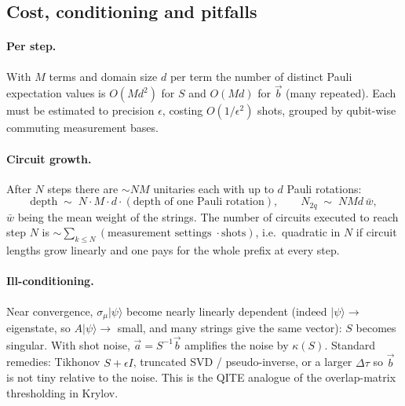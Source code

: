 \documentclass[11pt,a4paper]{article}
\newcommand{\ket}[1]{\lvert #1\rangle}
\begin{document}
\subsection{Cost, conditioning and pitfalls}\label{sec:cost}

\paragraph{Per step.}
With $M$ terms and domain size $d$ per term the number of distinct Pauli expectation values is
$O(M d^2)$ for $S$ and $O(M d)$ for $\vec b$ (many repeated). Each must be estimated to
precision $\epsilon$, costing $O(1/\epsilon^2)$ shots, grouped by qubit-wise commuting
measurement bases.

\paragraph{Circuit growth.}
After $N$ steps there are $\sim NM$ unitaries each with up to $d$ Pauli rotations:
\begin{equation}
  \text{depth}\;\sim\;N\cdot M\cdot d\cdot (\text{depth of one Pauli rotation}),\qquad
  N_{2q}\;\sim\;N M d\,\bar w,
\end{equation}
$\bar w$ being the mean weight of the strings. The number of circuits executed to reach
step $N$ is $\sim\sum_{k\le N}(\text{measurement settings}\;\cdot\text{shots})$, i.e.\ quadratic in $N$ if
circuit lengths grow linearly and one pays for the whole prefix at every step.

\paragraph{Ill-conditioning.}
Near convergence, $\sigma_\mu\ket\psi$ become nearly linearly dependent (indeed
$\ket\psi\to$ eigenstate, so $A\ket\psi\to$ small, and many strings give the same vector):
$S$ becomes \alert{singular}. With shot noise, $\vec a=S^{-1}\vec b$ amplifies the noise by $\kappa(S)$.
Standard remedies: Tikhonov $S+\epsilon I$, truncated SVD / pseudo-inverse, or a larger
$\Delta\tau$ so $\vec b$ is not tiny relative to the noise. This is the QITE analogue of the
overlap-matrix thresholding in Krylov.
\end{document}
